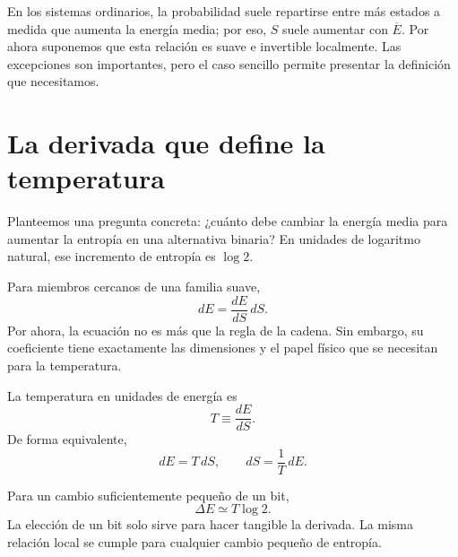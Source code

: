 En los sistemas ordinarios, la probabilidad suele repartirse entre más estados a medida que aumenta la energía media; por eso, \(S\) suele aumentar con \(\overline E\). Por ahora suponemos que esta relación es suave e invertible localmente. Las excepciones son importantes, pero el caso sencillo permite presentar la definición que necesitamos.

\section{La derivada que define la temperatura}

Planteemos una pregunta concreta: ¿cuánto debe cambiar la energía media para aumentar la entropía en una alternativa binaria? En unidades de logaritmo natural, ese incremento de entropía es \(\log2\).

Para miembros cercanos de una familia suave,
\begin{equation}
 dE=\frac{dE}{dS}\,dS.
 \label{eq:sm2-differential-identity}
\end{equation}
Por ahora, la ecuación no es más que la regla de la cadena. Sin embargo, su coeficiente tiene exactamente las dimensiones y el papel físico que se necesitan para la temperatura.

\begin{definition}La temperatura en unidades de energía es
\begin{equation}
 T\equiv\frac{dE}{dS}.
 \label{eq:sm2-temperature-definition}
\end{equation}
De forma equivalente,
\begin{equation}
 dE=T\,dS,
 \qquad
 dS=\frac{1}{T}\,dE.
 \label{eq:sm2-fundamental-differentials}
\end{equation}
\end{definition}

Para un cambio suficientemente pequeño de un bit,
\begin{equation}
 \Delta E\simeq T\log2.
 \label{eq:sm2-one-bit-energy}
\end{equation}
La elección de un bit solo sirve para hacer tangible la derivada. La misma relación local se cumple para cualquier cambio pequeño de entropía.

\begin{classroomqa}
\end{classroomqa}

